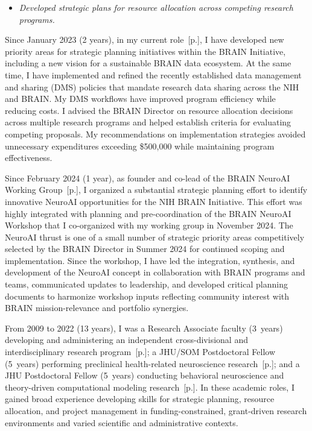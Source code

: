 \documentclass[10pt]{article}
\newcommand{\see}[1]{[\textcolor{hopkinsblue}{p.\pageref{sec:#1}}]}
\begin{document}
\begin{itemize}
  \color{hopkinsblue}
  \item \emph{Developed strategic plans for resource allocation across competing
research programs.}
\end{itemize}

Since January 2023 (2 years), in my current role~\see{jobobd}, I have developed
new priority areas for strategic planning initiatives within the BRAIN
Initiative, including a new vision for a sustainable BRAIN data ecosystem.
At the same time, I have implemented and refined the recently established
data management and sharing (DMS) policies that mandate research data sharing
across the NIH and BRAIN. My DMS workflows have improved program efficiency
while reducing costs. I advised the BRAIN Director on resource allocation
decisions across multiple research programs and helped establish criteria for
evaluating competing proposals. My recommendations on implementation strategies
avoided unnecessary expenditures exceeding \$500,000 while maintaining program
effectiveness.

Since February 2024 (1 year), as founder and co-lead of the BRAIN NeuroAI
Working Group~\see{jobobd}, I organized a substantial strategic planning effort
to identify innovative NeuroAI opportunities for the NIH BRAIN Initiative.
This effort was highly integrated with planning and pre-coordination of the
BRAIN NeuroAI Workshop that I co-organized with my working group in November
2024. The NeuroAI thrust is one of a small number of strategic priority areas
competitively selected by the BRAIN Director in Summer 2024 for continued
scoping and implementation. Since the workshop, I have led the integration,
synthesis, and development of the NeuroAI concept in collaboration with BRAIN
programs and teams, communicated updates to leadership, and developed critical
planning documents to harmonize workshop inputs reflecting community interest
with BRAIN mission-relevance and portfolio synergies.

From 2009 to 2022 (13 years), I was a Research Associate faculty
(3~years) developing and administering an independent cross-divisional
and interdisciplinary research program~\see{job1}; a JHU/SOM Postdoctoral
Fellow (5~years) performing preclinical health-related neuroscience
research~\see{job2}; and a JHU Postdoctoral Fellow (5~years) conducting
behavioral neuroscience and theory-driven computational modeling
research~\see{job3}. In these academic roles, I gained broad experience
developing skills for strategic planning, resource allocation, and project
management in funding-constrained, grant-driven research environments and varied
scientific and administrative contexts.
\end{document}
